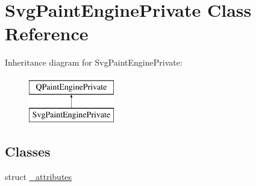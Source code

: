 \hypertarget{class_svg_paint_engine_private}{}\section{Svg\+Paint\+Engine\+Private Class Reference}
\label{class_svg_paint_engine_private}
Inheritance diagram for Svg\+Paint\+Engine\+Private\+:\begin{figure}[H]
\begin{center}
\leavevmode
\includegraphics[height=2.000000cm]{class_svg_paint_engine_private}
\end{center}
\end{figure}
\subsection*{Classes}
\begin{DoxyCompactItemize}
\item 
struct \hyperlink{struct_svg_paint_engine_private_1_1__attributes}{\+\_\+attributes}
\end{DoxyCompactItemize}
